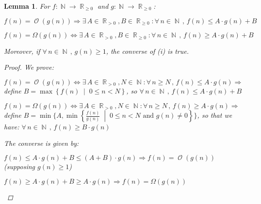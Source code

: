 \documentclass[12pt]{article}
\let\RA\Rightarrow
\let\LR\Leftrightarrow
\newcommand{\set}[2]{\left\{{#1}\;\middle|\;{#2}\right\}}
\newcommand{\Forall}[1]{\forall\,{#1}\,,\,}
\newcommand{\Exist}[1]{\exists\,{#1}:}
\DeclareMathOperator{\N}{\mathbb{N}}
\DeclareMathOperator{\R}{\mathbb{R}}
\DeclareMathOperator{\Ord}{\mathcal{O}}
\newtheorem{lemma}[theorem]{Lemma}
\begin{document}
\begin{lemma}
  For $f:\N\to\R_{\geq 0}$ and $g:\N\to\R_{\geq 0}$:
  \begin{compactenum}[(i)]
    \item $f(n)=\Ord(g(n))\RA\Exist{A\in\R_{>0},B\in\R_{\geq 0}}\Forall{n\in\N}f(n)\leq A\cdot g(n)+B$
    \item $f(n)=\Omega(g(n))\LR\Exist{A\in\R_{>0},B\in\R_{\geq 0}}\Forall{n\in\N}f(n)\geq A\cdot g(n)+B$
  \end{compactenum}
  Moreover, if $\Forall{n\in\N}g(n)\geq 1$, the converse of (i) is true.
  \begin{proof}
    We prove:
    \begin{compactenum}[(i)]
      \item $f(n)=\Ord(g(n))\LR\Exist{A\in\R_{>0},N\in\N}\Forall{n\geq N}f(n)\leq A\cdot g(n)\RA$ define $B=\max\set{f(n)}{0\leq n<N}$, so $\Forall{n\in\N}f(n)\leq A\cdot g(n)+B$
      \item $f(n)=\Omega(g(n))\LR\Exist{A\in\R_{>0},N\in\N}\Forall{n\geq N}f(n)\geq A\cdot g(n)\RA$ define $B=\min\Big\{A,\min\set{\frac{f(n)}{g(n)}}{0\leq n<N\text{ and }g(n)\neq 0}\Big\}$, so that we have: $\Forall{n\in\N}f(n)\geq B\cdot g(n)$
    \end{compactenum}
    The converse is given by:
    \begin{compactenum}[(i)]
      \item $f(n)\leq A\cdot g(n)+B\leq (A+B)\cdot g(n)\RA f(n)=\Ord(g(n))$ (supposing $g(n)\geq 1$)
      \item $f(n)\geq A\cdot g(n)+B\geq A\cdot g(n)\RA f(n)=\Omega(g(n))$
    \end{compactenum}
  \end{proof}
\end{lemma}
\end{document}
